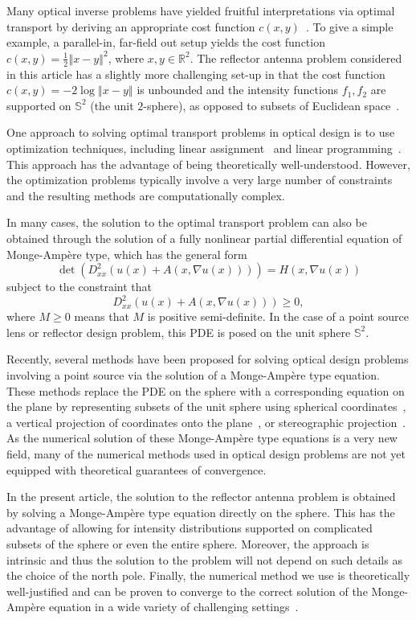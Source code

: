 \documentclass{amsart}
\newcommand{\bq}{\begin{equation}}
\newcommand{\eq}{\end{equation}}
\newcommand{\Sf}{\mathbb{S}^{2}}
\newcommand{\MA}{Monge-Amp\`ere\xspace}
\theoremstyle{lemma}
\theoremstyle{remark}
\begin{document}
Many optical inverse problems have yielded fruitful interpretations via optimal transport by deriving an appropriate cost function $c(x,y)$~\cite{YadavThesis}. To give a simple example, a parallel-in, far-field out setup yields the cost function $c(x,y) = \frac{1}{2}\left\Vert x - y \right\Vert^2$, where $x,y \in \mathbb{R}^2$.  The reflector antenna problem considered in this article
 has a slightly more challenging set-up in that the cost function $c(x,y) = -2\log \left\Vert x - y \right\Vert$ is unbounded and the intensity functions $f_1, f_2$ are supported on $\mathbb{S}^2$ (the unit $2$-sphere), as opposed to subsets of Euclidean space~\cite{GangboOliker,OlikerNewman,Wang_Reflector,Wang_Reflector2}. 

One approach to solving optimal transport problems in optical design is to use optimization techniques, including linear assignment~\cite{Doskolovich_farfield} and linear programming~\cite{GlimmOliker_SingleReflector}.  This approach has the advantage of being theoretically well-understood.  However, the optimization problems typically involve a very large number of constraints and the resulting methods are computationally complex. 

In many cases, the solution to the optimal transport problem can also be obtained through the solution of a fully nonlinear partial differential equation of \MA type, which has the general form
\bq\label{eq:MA}
\det(D_{xx}^2(u(x)+A(x,\nabla u(x)))) = H(x,\nabla u(x))
\eq
subject to the constraint that
\bq\label{eq:cconvex}
D_{xx}^2(u(x)+A(x,\nabla u(x))) \geq 0,
\eq
where $M\geq 0$ means that $M$ is positive semi-definite.  In the case of a point source lens or reflector design problem, this PDE is posed on the unit sphere $\Sf$.

Recently, several methods have been proposed for solving optical design problems involving a point source via the solution of a \MA type equation.  These methods replace the PDE on the sphere with a corresponding equation on the plane by representing subsets of the unit sphere using spherical coordinates~\cite{Wu_lensdesign}, a vertical projection of coordinates onto the plane~\cite{Brix_MAOptics}, or stereographic projection~\cite{RomijnSphere}.  As the numerical solution of these \MA type equations is a very new field, many of the numerical methods used in optical design problems are not yet equipped with theoretical guarantees of convergence.

In the present article, the solution to the reflector antenna problem is obtained by solving a \MA type equation directly on the sphere.  This has the advantage of allowing for intensity distributions supported on complicated subsets of the sphere or even the entire sphere.  Moreover, the approach is intrinsic and thus the solution to the problem will not depend on such details as the choice of the north pole.  Finally, the numerical method we use is theoretically well-justified and can be proven to converge to the correct solution of the \MA equation in a wide variety of challenging settings~\cite{HT_OTonSphere, HT_OTonSphere2}.
\end{document}
